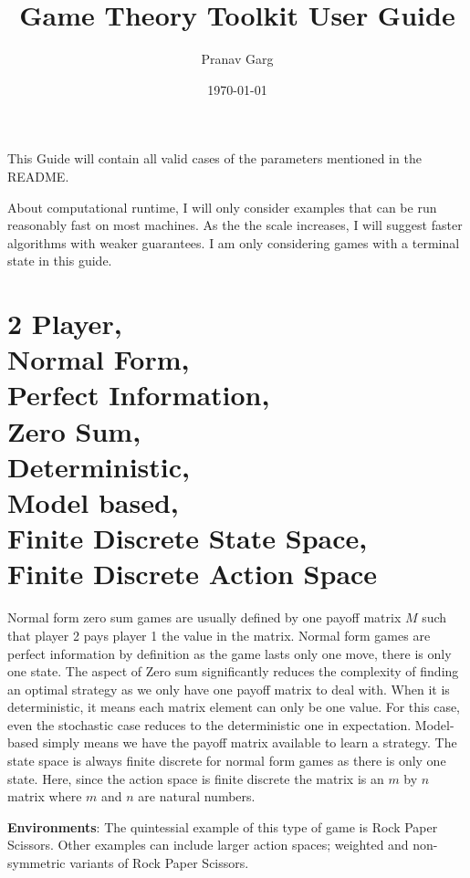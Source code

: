 \documentclass[a4paper,12pt]{article}
\begin{document}
\title{Game Theory Toolkit User Guide}
\author{Pranav Garg}
\date{\today}
\maketitle

This Guide will contain all valid cases of the parameters mentioned in the README.

About computational runtime, I will only consider examples that can be run reasonably fast on most machines. As the the scale increases, I will suggest faster algorithms with weaker guarantees.
I am only considering games with a terminal state in this guide.

\pagebreak

\section[2 Player, Normal Form, Perfect Information, Zero Sum, Deterministic, Model based, Finite State Space, Finite Action Space]{2 Player, \\
Normal Form, \\
Perfect Information, \\
Zero Sum, \\
Deterministic, \\
Model based, \\
Finite Discrete State Space, \\
Finite Discrete Action Space}

Normal form zero sum games are usually defined by one payoff matrix $M$ such that player 2 pays player 1 the value in the matrix. Normal form games are perfect information by definition as the game lasts only one move, there is only one state. The aspect of Zero sum significantly reduces the complexity of finding an optimal strategy as we only have one payoff matrix to deal with. When it is deterministic, it means each matrix element can only be one value. For this case, even the stochastic case reduces to the deterministic one in expectation. Model-based simply means we have the payoff matrix available to learn a strategy. The state space is always finite discrete for normal form games as there is only one state. Here, since the action space is finite discrete the matrix is an $m$ by $n$ matrix where $m$ and $n$ are natural numbers. 

\textbf{Environments}: The quintessial example of this type of game is Rock Paper Scissors. Other examples can include larger action spaces; weighted and non-symmetric variants of Rock Paper Scissors.
\end{document}
